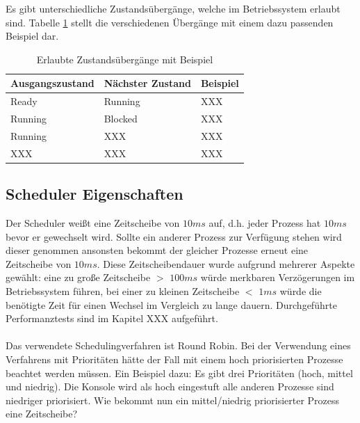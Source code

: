 Es gibt unterschiedliche Zustandsübergänge, welche im Betriebssystem erlaubt sind. Tabelle \ref{table:State-transition} stellt die verschiedenen Übergänge mit einem dazu passenden Beispiel dar.

\begin{table}[H]
\begin{tabular}{p{3cm} | p{3cm} | p{6cm}}
  \textbf{Ausgangszustand} & \textbf{Nächster Zustand} & \textbf{Beispiel} 
  \\ \hline
  Ready & Running & XXX \\
  Running & Blocked & XXX \\
  Running & XXX & XXX \\
  XXX & XXX & XXX \\
  
 \end{tabular}
 \caption{Erlaubte Zustandsübergänge mit Beispiel}
 \label{table:State-transition}
\end{table}

\subsection{Scheduler Eigenschaften}
Der Scheduler weißt eine Zeitscheibe von $10ms$ auf, d.h. jeder Prozess hat $10ms$ bevor er gewechselt wird. Sollte ein anderer Prozess zur Verfügung stehen wird dieser genommen ansonsten bekommt der gleicher Prozesse erneut eine Zeitscheibe von $10ms$. Diese Zeitscheibendauer wurde aufgrund mehrerer Aspekte gewählt: eine zu große Zeitscheibe $>$ $100ms$ würde merkbaren Verzögerungen im Betriebssystem führen, bei einer zu kleinen Zeitscheibe $<$ $1ms$ würde die benötigte Zeit für einen Wechsel im Vergleich zu lange dauern. Durchgeführte Performanztests sind im Kapitel XXX aufgeführt. \\ \\
Das verwendete Schedulingverfahren ist Round Robin. Bei der Verwendung eines Verfahrens mit Prioritäten hätte der Fall mit einem hoch priorisierten Prozesse beachtet werden müssen. Ein Beispiel dazu: Es gibt drei Prioritäten (hoch, mittel und niedrig). Die Konsole wird als hoch eingestuft alle anderen Prozesse sind niedriger priorisiert. Wie bekommt nun ein mittel/niedrig priorisierter Prozess eine Zeitscheibe?


